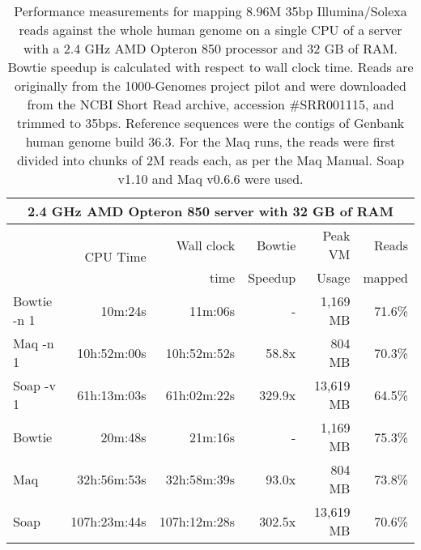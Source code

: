 \documentclass[letterpaper]{article}
\begin{document}
\begin{table}[tp]
\scriptsize
\begin{tabular}{lrrrrr}
\multicolumn{6}{c}{\small{2.4 GHz AMD Opteron 850 server with 32 GB of RAM}}\\[3pt]
\toprule
 & \multirow{2}{*}{CPU Time} & Wall clock & Bowtie  & Peak VM & Reads  \\
 &                            & time       & Speedup & Usage   & mapped \\[3pt]
\toprule
Bowtie -n 1 & 10m:24s & 11m:06s & - & 1,169 MB & 71.6\%\\\midrule
Maq -n 1 & 10h:52m:00s & 10h:52m:52s & 58.8x & 804 MB & 70.3\%\\\midrule
Soap -v 1 & 61h:13m:03s & 61h:02m:22s & 329.9x & 13,619 MB & 64.5\%\\\midrule
\midrule
Bowtie & 20m:48s & 21m:16s & - & 1,169 MB & 75.3\%\\\midrule
Maq & 32h:56m:53s & 32h:58m:39s & 93.0x & 804 MB & 73.8\%\\\midrule
Soap & 107h:23m:44s & 107h:12m:28s & 302.5x & 13,619 MB & 70.6\%\\
\bottomrule
\end{tabular}
\caption{Performance measurements for mapping 8.96M 35bp Illumina/Solexa reads against the whole human genome on a single CPU of a server with a 2.4 GHz AMD Opteron 850 processor and 32 GB of RAM. Bowtie speedup is calculated with respect to wall clock time. Reads are originally from the 1000-Genomes project pilot and were downloaded from the NCBI Short Read archive, accession \#SRR001115, and trimmed to 35bps. Reference sequences were the contigs of Genbank human genome build 36.3. For the Maq runs, the reads were first divided into chunks of 2M reads each, as per the Maq Manual. Soap v1.10 and Maq v0.6.6 were used.}
\end{table}
\end{document}

